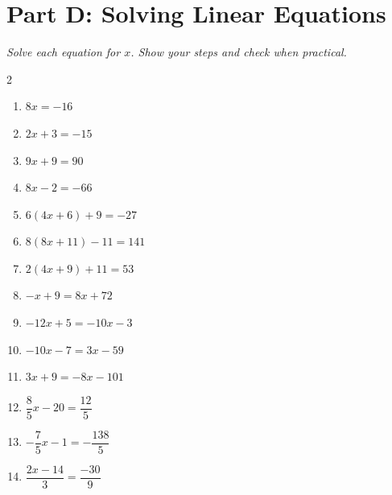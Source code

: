 \documentclass[11pt]{article}
\begin{document}
\section*{Part D: Solving Linear Equations}
\noindent\textit{Solve each equation for $x$. Show your steps and check when practical.}
\begin{multicols}{2}
\begin{enumerate}
  \item $8x = -16$
  \vspace{1.9cm}
  \item $2x + 3 = -15$
  \vspace{1.9cm}
  \item $9x + 9 = 90$
  \vspace{1.9cm}
  \item $8x - 2 = -66$
  \vspace{1.9cm}
  \item $6(4x + 6) + 9 = -27$
  \vspace{1.9cm}
  \item $8(8x + 11) - 11 = 141$
  \vspace{1.9cm}
  \item $2(4x + 9) + 11 = 53$
  \vspace{1.9cm}
  \item $-x + 9 = 8x + 72$
  \vspace{1.9cm}
  \item $-12x + 5 = -10x - 3$
  \vspace{1.9cm}
  \item $-10x - 7 = 3x - 59$
  \vspace{1.9cm}
  \item $3x + 9 = -8x - 101$
  \vspace{1.9cm}
  \item $\dfrac{8}{5}x - 20 = \dfrac{12}{5}$
  \vspace{1.9cm}
  \item $-\dfrac{7}{5}x - 1 = -\dfrac{138}{5}$
  \vspace{1.9cm}
  \item $\dfrac{2x - 14}{3} = \dfrac{-30}{9}$
  \vspace{1.9cm}
\end{enumerate}
\end{multicols}
\end{document}
